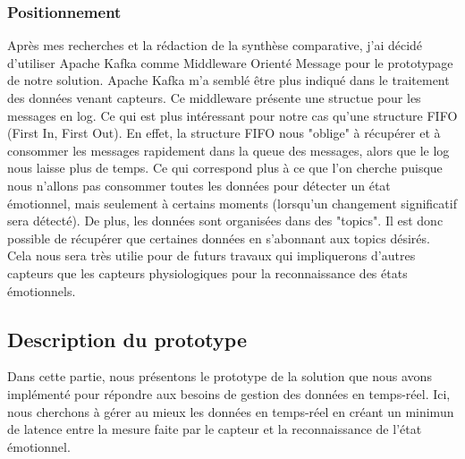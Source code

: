 \documentclass{article}
\begin{document}
		\subsubsection{Positionnement}\label{sec:position}
			Après mes recherches et la rédaction de la synthèse comparative, j'ai décidé d'utiliser Apache Kafka comme Middleware Orienté Message pour le prototypage de notre solution.
			Apache Kafka m'a semblé être plus indiqué dans le traitement des données venant capteurs.
			Ce middleware présente une structue pour les messages en log.
			Ce qui est plus intéressant pour notre cas qu'une structure FIFO (First In, First Out).
			En effet, la structure FIFO nous "oblige" à récupérer et à consommer les messages rapidement dans la queue des messages, alors que le log nous laisse plus de temps.
			Ce qui correspond plus à ce que l'on cherche puisque nous n'allons pas consommer toutes les données pour détecter un état émotionnel, mais seulement à certains moments (lorsqu'un changement significatif sera détecté).
			De plus, les données sont organisées dans des "topics".
			Il est donc possible de récupérer que certaines données en s'abonnant aux topics désirés.
			Cela nous sera très utilie pour de futurs travaux qui impliquerons d'autres capteurs que les capteurs physiologiques pour la reconnaissance des états émotionnels.
	\subsection{Description du prototype}\label{sec:protodesc}
		Dans cette partie, nous présentons le prototype de la solution que nous avons implémenté pour répondre aux besoins de gestion des données en temps-réel.
		Ici, nous cherchons à gérer au mieux les données en temps-réel en créant un minimun de latence entre la mesure faite par le capteur et la reconnaissance de l'état émotionnel.\par
\end{document}
